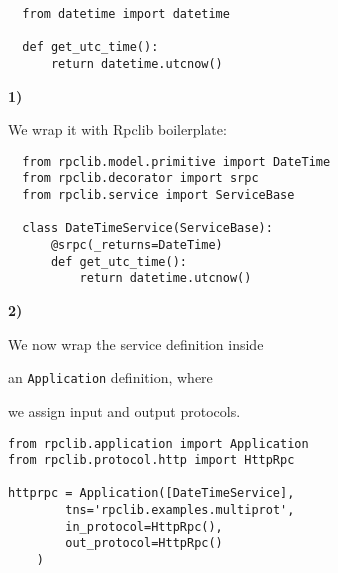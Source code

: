 \documentclass{beamer}
\begin{document}
\begin{frame}[fragile]
  \large
  \begin{lstlisting}
  from datetime import datetime

  def get_utc_time():
      return datetime.utcnow()
  \end{lstlisting}
\end{frame}

\begin{frame}
  \LARGE

  \color{red} \textbf{1)} \color{black}


    \begin{center}
      We wrap it with Rpclib boilerplate:
    \end{center}

\end{frame}

\begin{frame}[fragile]
  \begin{lstlisting}
  from rpclib.model.primitive import DateTime
  from rpclib.decorator import srpc
  from rpclib.service import ServiceBase

  class DateTimeService(ServiceBase):
      @srpc(_returns=DateTime)
      def get_utc_time():
          return datetime.utcnow()
  \end{lstlisting}
\end{frame}

\begin{frame}
  \LARGE

  \color{red} \textbf{2)} \color{black}

  \begin{center}
    We now wrap the service definition inside

    \bigskip

    an \texttt{Application} definition, where

    \bigskip

    we assign input and output protocols.

  \end{center}

\end{frame}

\begin{frame}[fragile]
  \begin{lstlisting}
from rpclib.application import Application
from rpclib.protocol.http import HttpRpc

httprpc = Application([DateTimeService], 
        tns='rpclib.examples.multiprot',
        in_protocol=HttpRpc(), 
        out_protocol=HttpRpc()
    )
  \end{lstlisting}
\end{frame}
\end{document}
